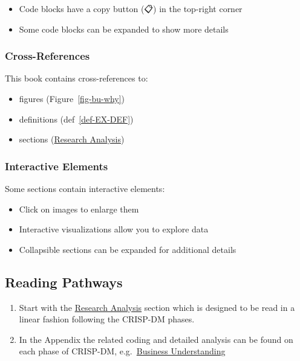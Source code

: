 \documentclass[
  american,
  10,
  a4paper,
]{book}
\providecommand{\tightlist}{%
  \setlength{\itemsep}{0pt}\setlength{\parskip}{0pt}}
\theoremstyle{definition}
\theoremstyle{remark}
\begin{document}
\begin{itemize}
\tightlist
\item
  Code blocks have a copy button (📋) in the top-right corner
\item
  Some code blocks can be expanded to show more details
\end{itemize}

\subsubsection{Cross-References}\label{cross-references}

This book contains cross-references to:

\begin{itemize}
\tightlist
\item
  figures (Figure~\ref{fig-bu-why})
\item
  definitions (def~\ref{def-EX-DEF})\\
\item
  sections (\href{nb/00_pythias_advice_rev.html}{Research Analysis})
\end{itemize}

\subsubsection{Interactive Elements}\label{interactive-elements}

Some sections contain interactive elements:

\begin{itemize}
\tightlist
\item
  Click on images to enlarge them\\
\item
  Interactive visualizations allow you to explore data\\
\item
  Collapsible sections can be expanded for additional details
\end{itemize}

\subsection{Reading Pathways}\label{reading-pathways}

\begin{enumerate}
\def\labelenumi{\arabic{enumi}.}
\item
  Start with the \href{nb/00_pythias_advice_rev.html}{Research Analysis}
  section which is designed to be read in a linear fashion following the
  CRISP-DM phases.
\item
  In the Appendix the related coding and detailed analysis can be found
  on each phase of CRISP-DM,
  e.g.~\href{nb/01_business_understanding_rev.html}{Business
  Understanding}
\end{enumerate}
\end{document}
